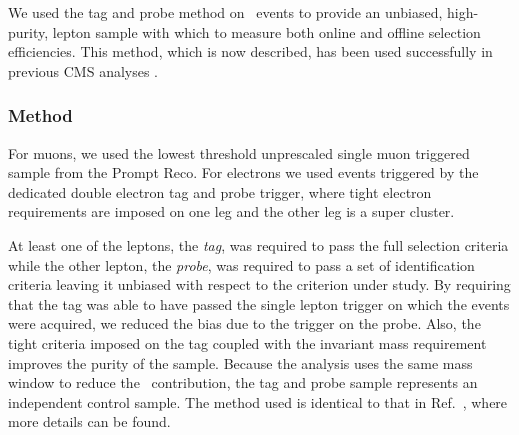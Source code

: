  
We used the tag and probe method on \dyll~events to provide an unbiased, high-purity, 
lepton sample with which to measure both online and offline selection efficiencies.
This method, which is now described, 
has been used successfully in previous CMS analyses \cite{ref:tagprobe_mit_w}\cite{ref:tagprobe_snt_top}.

\subsubsection{Method}
For muons, we used the lowest threshold unprescaled single muon triggered sample from the Prompt Reco.
For electrons we used events triggered by the dedicated double electron tag and probe trigger,
where tight electron requirements are imposed on one leg and the other leg is a super cluster.

At least one of the leptons, the {\it tag}, was required to pass the full selection criteria
while the other lepton, the {\it probe}, was required to pass a set of identification criteria leaving 
it unbiased with respect to the criterion under study. By requiring that the tag was able to have passed 
the single lepton trigger on which the events were acquired, we reduced the bias due to the trigger on 
the probe. Also, the tight criteria imposed on the tag coupled with the invariant mass requirement 
improves the purity of the sample. Because the analysis uses the same mass window to reduce the 
\dyll~contribution, the tag and probe sample represents an independent control sample.
The method used is identical to that in Ref.~\cite{HWW2011Final}, where more details can be found.


